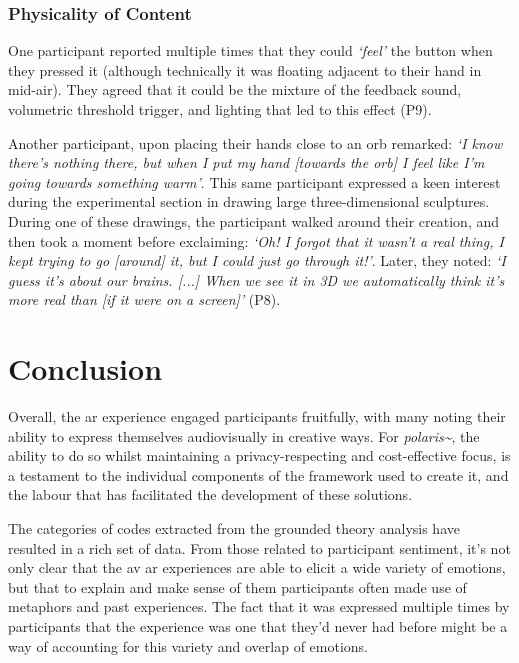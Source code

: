 \subsubsection{Physicality of Content}\label{sec: polaris-feedback-immersion-physicality}
One participant reported multiple times that they could \textit{`feel'} the button when they pressed it (although technically it was floating adjacent to their hand in mid-air). They agreed that it could be the mixture of the feedback sound, volumetric threshold trigger, and lighting that led to this effect (P9).

Another participant, upon placing their hands close to an orb remarked: \textit{`I know there's nothing there, but when I put my hand [towards the orb] I feel like I'm going towards something warm'}. This same participant expressed a keen interest during the experimental section in drawing large three-dimensional sculptures. During one of these drawings, the participant walked around their creation, and then took a moment before exclaiming: \textit{`Oh! I forgot that it wasn't a real thing, I kept trying to go [around] it, but I could just go through it!'}. Later, they noted: \textit{`I guess it's about our brains. [...] When we see it in 3D we automatically think it's more real than [if it were on a screen]'} (P8).

\section{Conclusion}\label{sec: polaris-conclusion}
Overall, the \gls{ar} experience engaged participants fruitfully, with many noting their ability to express themselves audiovisually in creative ways. For \textit{polaris\textasciitilde{}}, the ability to do so whilst maintaining a privacy-respecting and cost-effective focus, is a testament to the individual components of the framework used to create it, and the labour that has facilitated the development of these  solutions.

The categories of codes extracted from the grounded theory analysis have resulted in a rich set of data. From those related to participant sentiment, it's not only clear that the \gls{av} \gls{ar} experiences are able to elicit a wide variety of emotions, but that to explain and make sense of them participants often made use of metaphors and past experiences. The fact that it was expressed multiple times by participants that the experience was one that they'd never had before might be a way of accounting for this variety and overlap of emotions.

